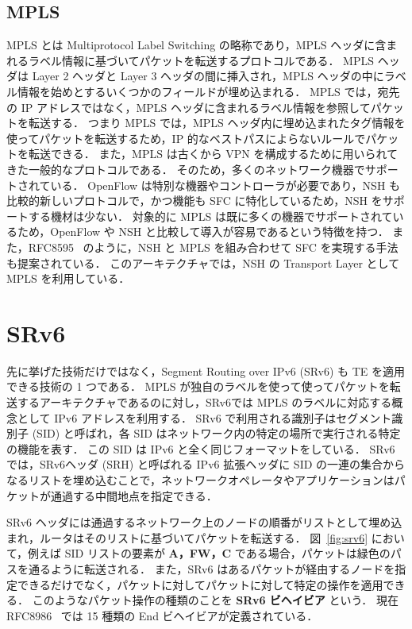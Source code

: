 \subsection*{MPLS}
\label{sbsection:mpls}
MPLS とは Multiprotocol Label Switching の略称であり，MPLS ヘッダに含まれるラベル情報に基づいてパケットを転送するプロトコルである．
MPLS ヘッダは Layer 2 ヘッダと Layer 3 ヘッダの間に挿入され，MPLS ヘッダの中にラベル情報を始めとするいくつかのフィールドが埋め込まれる．
MPLS では，宛先の IP アドレスではなく，MPLS ヘッダに含まれるラベル情報を参照してパケットを転送する．
つまり MPLS では，MPLS ヘッダ内に埋め込まれたタグ情報を使ってパケットを転送するため，IP 的なベストパスによらないルールでパケットを転送できる．
また，MPLS は古くから VPN を構成するために用いられてきた一般的なプロトコルである．
そのため，多くのネットワーク機器でサポートされている．
OpenFlow は特別な機器やコントローラが必要であり，NSH も比較的新しいプロトコルで，かつ機能も SFC に特化しているため，NSH をサポートする機材は少ない．
対象的に MPLS は既に多くの機器でサポートされているため，OpenFlow や NSH と比較して導入が容易であるという特徴を持つ．
また，RFC8595~\cite{rfc8595} のように，NSH と MPLS を組み合わせて SFC を実現する手法も提案されている．
このアーキテクチャでは，NSH の Transport Layer として MPLS を利用している．

\section{SRv6}
\label{section:srv6}
先に挙げた技術だけではなく，Segment Routing over IPv6 (SRv6) も TE を適用できる技術の 1 つである．
MPLS が独自のラベルを使って使ってパケットを転送するアーキテクチャであるのに対し，SRv6では MPLS のラベルに対応する概念として IPv6 アドレスを利用する．
SRv6 で利用される識別子はセグメント識別子 (SID) と呼ばれ，各 SID はネットワーク内の特定の場所で実行される特定の機能を表す．
この SID は IPv6 と全く同じフォーマットをしている．
SRv6 では，SRv6ヘッダ (SRH) と呼ばれる IPv6 拡張ヘッダに SID の一連の集合からなるリストを埋め込むことで，ネットワークオペレータやアプリケーションはパケットが通過する中間地点を指定できる．

SRv6 ヘッダには通過するネットワーク上のノードの順番がリストとして埋め込まれ，ルータはそのリストに基づいてパケットを転送する．
図~\ref*{fig:srv6} において，例えば SID リストの要素が \textbf{A，FW，C} である場合，パケットは緑色のパスを通るように転送される．
また，SRv6 はあるパケットが経由するノードを指定できるだけでなく，パケットに対してパケットに対して特定の操作を適用できる．
このようなパケット操作の種類のことを \textbf{SRv6 ビヘイビア} という．
現在 RFC8986~\cite{rfc8986} では 15 種類の End ビヘイビアが定義されている．

